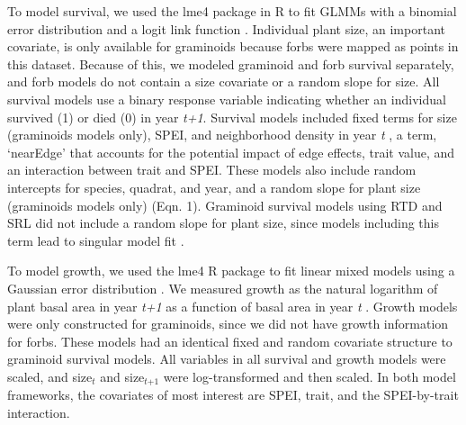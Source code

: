 \documentclass[12pt, letterpaper]{article}
\begin{document}
To model survival, we used the lme4 package in R to fit GLMMs with a binomial error distribution and a logit link function \citep{RCoreTeam2019, Bates2015ParsimoniousModels}. Individual plant size, an important covariate, is only available for graminoids because forbs were mapped as points in this dataset. Because of this, we modeled graminoid and forb survival separately, and forb models do not contain a size covariate or a random slope for size. All survival models use a binary response variable indicating whether an individual survived (1) or died (0) in year \textit{t+1}.  Survival models included fixed terms for size (graminoids models only), SPEI, and neighborhood density in year \textit{t} , a term, ‘nearEdge’ that accounts for the potential impact of edge effects, trait value, and an interaction between trait and SPEI. These models also include random intercepts for species, quadrat, and year, and a random slope for plant size (graminoids models only) (Eqn. 1). Graminoid survival models using RTD and SRL did not include a random slope for plant size, since models including this term lead to singular model fit \citep{Bates2015}. 

 To model growth, we used the lme4 R package to fit linear mixed models using a Gaussian error distribution \citep{RCoreTeam2019, Bates2015ParsimoniousModels}. We measured growth as the natural logarithm of plant basal area in year \textit{t+1} as a function of basal area in year \textit{t} \citep{Dalgleish2011, Dahlgren2009LinkingHerb}.  Growth models were only constructed for graminoids, since we did not have growth information for forbs. These models had an identical fixed and random covariate structure to graminoid survival models. All variables in all survival and growth models were scaled, and size$_{\textit{t}}$  and size$_{\textit{t+1}}$  were log-transformed and then scaled.  In both model frameworks, the covariates of most interest are SPEI, trait, and the SPEI-by-trait interaction.
 
\end{document}
